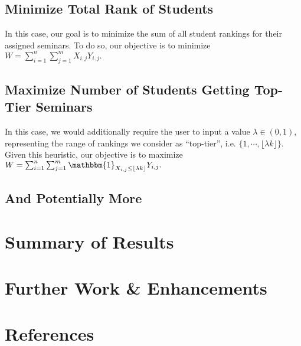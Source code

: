 \documentclass{article} %
\begin{document}
\subsection{Minimize Total Rank of Students}
    \par\qquad In this case, our goal is to minimize the sum of all student rankings for their assigned seminars. To do so, our objective is to minimize $W = \sum_{i=1}^{n}{\sum_{j=1}^{m}{X_{i,j}Y_{i,j}}}.$
\subsection{Maximize Number of Students Getting Top-Tier Seminars}
    \par\qquad In this case, we would additionally require the user to input a value $\lambda\in(0,1)$, representing the range of rankings we consider as ``top-tier'', i.e. $\{1,\cdots,\lfloor \lambda k\rfloor\}$. Given this heuristic, our objective is to maximize $W = \sum_{i=1}^{n}{\sum_{j=1}^{m}{\mathbbm{1}_{X_{i,j} \leq \lfloor \lambda k\rfloor}Y_{i,j}}}.$

\subsection{And Potentially More}

\section{Summary of Results}

\section{Further Work \& Enhancements}

\section{References}
\end{document}
